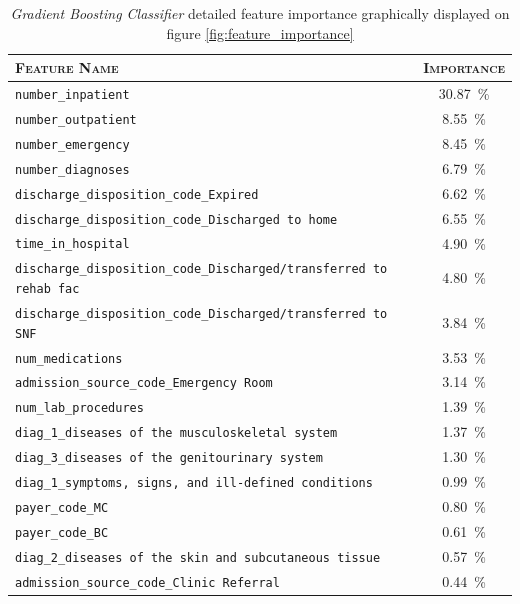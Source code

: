 \documentclass[a4paper,11pt]{article}
\begin{document}
\begin{table}[htb]
\caption{\textit{Gradient Boosting Classifier} detailed feature importance graphically displayed on figure \ref{fig:feature_importance}}
\label{tab:model_feature_importance}
\begin{tabularx}{\textwidth}{Pc}
\toprule
\textsc{Feature Name} & \textsc{Importance} \\
\midrule
\texttt{\small number\_inpatient} & \SI{30.87}{\percent} \\
\texttt{\small number\_outpatient} & \SI{8.55}{\percent} \\
\texttt{\small number\_emergency} & \SI{8.45}{\percent} \\
\texttt{\small number\_diagnoses} & \SI{6.79}{\percent} \\
\texttt{\small discharge\_disposition\_code\_Expired} & \SI{6.62}{\percent} \\
\texttt{\small discharge\_disposition\_code\_Discharged to home} & \SI{6.55}{\percent} \\
\texttt{\small time\_in\_hospital} & \SI{4.90}{\percent} \\
\texttt{\small discharge\_disposition\_code\_Discharged/transferred to rehab fac} & \SI{4.80}{\percent} \\
\texttt{\small discharge\_disposition\_code\_Discharged/transferred to SNF} & \SI{3.84}{\percent} \\
\texttt{\small num\_medications} & \SI{3.53}{\percent} \\
\texttt{\small admission\_source\_code\_Emergency Room} & \SI{3.14}{\percent} \\
\texttt{\small num\_lab\_procedures} & \SI{1.39}{\percent} \\
\texttt{\small diag\_1\_diseases of the musculoskeletal system} & \SI{1.37}{\percent} \\
\texttt{\small diag\_3\_diseases of the genitourinary system} & \SI{1.30}{\percent} \\
\texttt{\small diag\_1\_symptoms, signs, and ill-defined conditions} & \SI{0.99}{\percent} \\
\texttt{\small payer\_code\_MC} & \SI{0.80}{\percent} \\
\texttt{\small payer\_code\_BC} & \SI{0.61}{\percent} \\
\texttt{\small diag\_2\_diseases of the skin and subcutaneous tissue} & \SI{0.57}{\percent} \\
\texttt{\small admission\_source\_code\_Clinic Referral} & \SI{0.44}{\percent} \\

\end{tabularx}
\end{table}
\end{document}

